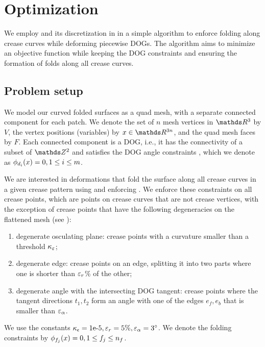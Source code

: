 
\section{Optimization} \label{sec:implementation}
We employ  and its discretization in  in a simple algorithm to enforce folding along crease curves while deforming piecewise DOGs. The algorithm aims to minimize an objective function while keeping the DOG constraints and ensuring the formation of folds along all crease curves.

\subsection{Problem setup}
We model our curved folded surfaces as a quad mesh, with a separate connected component for each patch. We denote the set of $n$ mesh vertices in $\R^3$ by $V$, the vertex positions (variables) by $\x \in \R^{3n}$, and the quad mesh faces by $F$. Each connected component is a DOG, i.e., it has the connectivity of a subset of $\Z^2$ and satisfies the DOG angle constraints \cite{rabi18}, which we denote as $\phi_{d_i}(x) = 0, 1 \leq i \leq m$.

We are interested in deformations that fold the surface along all crease curves in a given crease pattern using  and enforcing . We enforce these constraints on all crease points, which are points on crease curves that are not crease vertices, with the exception of crease points that have the following degeneracies on the flattened mesh (see ):
\begin{enumerate}
	\item degenerate osculating plane: crease points with a curvature smaller than a threshold $\kappa_\varepsilon$; \label{item:deg_osc}
	\item degenerate edge: crease points on an edge, splitting it into two parts where one is shorter than $\varepsilon_{r}$\% of the other; \label{item:deg_edge}
	\item degenerate angle with the intersecting DOG tangent: crease points where the tangent directions $t_1,t_2$ form an angle with one of the edges $e_f,e_b$ that is smaller than $\varepsilon_\alpha$. \label{item:deg_tan_angle}
\end{enumerate}
We use the constants $\kappa_\epsilon=\text{1e-5}, \varepsilon_r=5\%, \varepsilon_\alpha=3^{\circ}$. We denote the folding constraints by $\phi_{f_j}(x) = 0, 1 \leq f_j \leq n_f$.


